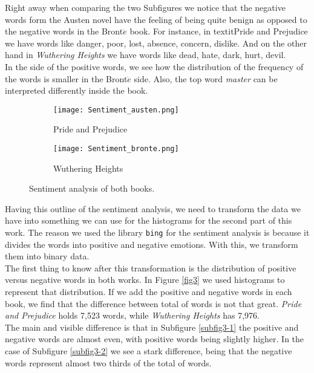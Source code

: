 \documentclass{article}
\begin{document}
Right away when comparing the two Subfigures we notice that the negative words form the Austen novel have the feeling of being quite benign as opposed to the negative words in the Bront$\ddot{e}$ book. For instance, in textit{Pride and Prejudice} we have words like danger, poor, lost, absence, concern, dislike. And on the other hand in \textit{Wuthering Heights} we have words like dead, hate, dark, hurt, devil.\\

In the side of the positive words, we see how the distribution of the frequency of the words is smaller in the Bront$\ddot{e}$ side. Also, the top word \textit{master} can be interpreted differently inside the book. \\

\begin{figure}[]
\begin{subfigure}{1\textwidth}
  \centering
  \texttt{[image: Sentiment\_austen.png]}  
  \caption{Pride and Prejudice}
  \label{subfig2-1}
\end{subfigure}
\newline
\begin{subfigure}{1\textwidth}
  \centering
  \texttt{[image: Sentiment\_bronte.png]}  
  \caption{Wuthering Heights}
  \label{subfig2-2}
\end{subfigure}
\caption{Sentiment analysis of both books.}
\label{fig2}
\end{figure}

\clearpage

Having this outline of the sentiment analysis, we need to transform the data we have into something we can use for the histograms for the second part of this work. The reason we used the library \texttt{bing} for the sentiment analysis is because it divides the words into positive and negative emotions. With this, we transform them into binary data. \\

The first thing to know after this transformation is the distribution of positive versus negative words in both works. In Figure \ref{fig3} we used histograms to represent that distribution. If we add the positive and negative words in each book, we find that the difference between total of words is not that great. \textit{Pride and Prejudice} holds 7,523 words, while \textit{Wuthering Heights} has 7,976.\\

The main and visible difference is that in Subfigure \ref{subfig3-1} the positive and negative words are almost even, with positive words being slightly higher. In the case of Subfigure \ref{subfig3-2} we see a stark difference, being that the negative words represent almost two thirds of the total of words. \\
\end{document}
